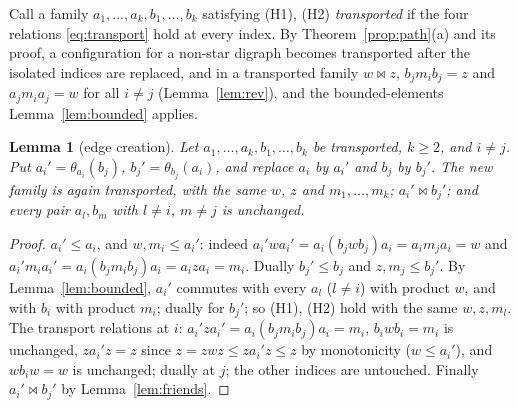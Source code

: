 \documentclass[11pt]{amsart}
\newtheorem{lemma}[theorem]{Lemma}
\theoremstyle{definition}
\begin{document}
Call a family $a_1,\dots,a_k,b_1,\dots,b_k$ satisfying (H1), (H2) \emph{transported} if the four relations \eqref{eq:transport} hold at every index. By Theorem~\ref{prop:path}(a) and its proof, a configuration for a non-star digraph becomes transported after the isolated indices are replaced, and in a transported family $w\bowtie z$, $b_jm_ib_j=z$ and $a_jm_ia_j=w$ for all $i\ne j$ (Lemma~\ref{lem:rev}), and the bounded-elements Lemma~\ref{lem:bounded} applies.

\begin{lemma}[edge creation]\label{lem:create}
Let $a_1,\dots,a_k,b_1,\dots,b_k$ be transported, $k\ge2$, and $i\ne j$. Put $a_i'=\theta_{a_i}(b_j)$, $b_j'=\theta_{b_j}(a_i)$, and replace $a_i$ by $a_i'$ and $b_j$ by $b_j'$. The new family is again transported, with the same $w$, $z$ and $m_1,\dots,m_k$; $a_i'\bowtie b_j'$; and every pair $a_l,b_m$ with $l\ne i$, $m\ne j$ is unchanged.
\end{lemma}
\begin{proof}
$a_i'\le a_i$, and $w,m_i\le a_i'$: indeed $a_i'wa_i'=a_i(b_jwb_j)a_i=a_im_ja_i=w$ and $a_i'm_ia_i'=a_i(b_jm_ib_j)a_i=a_iza_i=m_i$. Dually $b_j'\le b_j$ and $z,m_j\le b_j'$. By Lemma~\ref{lem:bounded}, $a_i'$ commutes with every $a_l$ ($l\ne i$) with product $w$, and with $b_i$ with product $m_i$; dually for $b_j'$; so (H1), (H2) hold with the same $w,z,m_l$. The transport relations at $i$: $a_i'za_i'=a_i(b_jm_ib_j)a_i=m_i$, $b_iwb_i=m_i$ is unchanged, $za_i'z=z$ since $z=zwz\le za_i'z\le z$ by monotonicity ($w\le a_i'$), and $wb_iw=w$ is unchanged; dually at $j$; the other indices are untouched. Finally $a_i'\bowtie b_j'$ by Lemma~\ref{lem:friends}.
\end{proof}
\end{document}
